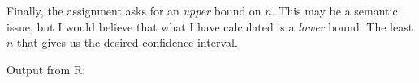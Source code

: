 \documentclass[a4paper,english,12pt]{article}
\begin{document}
Finally, the assignment asks for an \textit{upper} bound on $n$. This may be a
semantic issue, but I would believe that what I have calculated is a
\textit{lower} bound: The least $n$ that gives us the desired confidence
interval.

%
%

Output from R:

\clearpage


\end{document}
